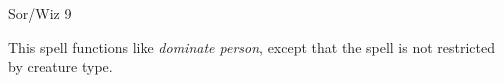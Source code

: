 
\begin{description*}
\item[Level:] Sor/Wiz 9
\end{description*}

This spell functions like \textit{dominate person}, except that the spell is not
restricted by creature type.